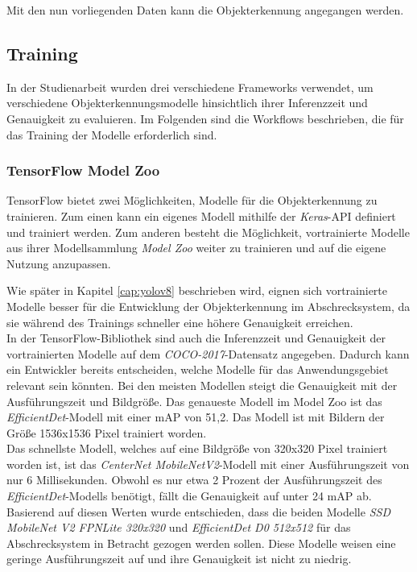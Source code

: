 Mit den nun vorliegenden Daten kann die Objekterkennung angegangen werden.

\subsection{Training}

In der Studienarbeit wurden drei verschiedene Frameworks verwendet, um verschiedene Objekterkennungsmodelle hinsichtlich ihrer Inferenzzeit und Genauigkeit zu evaluieren. Im Folgenden sind die Workflows beschrieben, die für das Training der Modelle erforderlich sind.

\subsubsection{TensorFlow Model Zoo} \label{cap:tensorflow}

TensorFlow bietet zwei Möglichkeiten, Modelle für die Objekterkennung zu trainieren. Zum einen kann ein eigenes Modell mithilfe der \textit{Keras}-API definiert und trainiert werden. Zum anderen besteht die Möglichkeit, vortrainierte Modelle aus ihrer Modellsammlung \textit{Model Zoo} weiter zu trainieren und auf die eigene Nutzung anzupassen. 

Wie später in Kapitel \ref{cap:yolov8} beschrieben wird, eignen sich vortrainierte Modelle besser für die Entwicklung der Objekterkennung im Abschrecksystem, da sie während des Trainings schneller eine höhere Genauigkeit erreichen.
\\
In der TensorFlow-Bibliothek sind auch die Inferenzzeit und Genauigkeit der vortrainierten Modelle auf dem \textit{COCO-2017}-Datensatz angegeben. Dadurch kann ein Entwickler bereits entscheiden, welche Modelle für das Anwendungsgebiet relevant sein könnten. Bei den meisten Modellen steigt die Genauigkeit mit der Ausführungszeit und Bildgröße.  Das genaueste Modell im Model Zoo ist das \textit{EfficientDet}-Modell mit einer \ac{mAP} von 51,2. Das Modell ist mit Bildern der Größe 1536x1536 Pixel trainiert worden.
\\
Das schnellste Modell, welches auf eine Bildgröße von 320x320 Pixel trainiert worden ist, ist das \textit{CenterNet MobileNetV2}-Modell mit einer Ausführungszeit von nur 6 Millisekunden. Obwohl es nur etwa 2 Prozent der Ausführungszeit des \textit{EfficientDet}-Modells benötigt, fällt die Genauigkeit auf unter 24 \ac{mAP} ab.
\\
Basierend auf diesen Werten wurde entschieden, dass die beiden Modelle \textit{SSD MobileNet V2 FPNLite 320x320} und \textit{EfficientDet D0 512x512} für das Abschrecksystem in Betracht gezogen werden sollen. Diese Modelle weisen eine geringe Ausführungszeit auf und ihre Genauigkeit ist nicht zu niedrig. \cite{tens_zoo}

